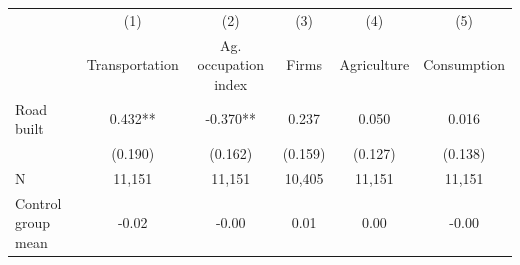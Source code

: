 {
\def\sym#1{\ifmmode^{#1}\else\(^{#1}\)\fi}
\begin{tabular}{l*{5}{c}}
\hline\hline
                         &\multicolumn{1}{c}{(1)}&\multicolumn{1}{c}{(2)}&\multicolumn{1}{c}{(3)}&\multicolumn{1}{c}{(4)}&\multicolumn{1}{c}{(5)}\\
                         &\multicolumn{1}{c}{Transportation}&\multicolumn{1}{c}{Ag. occupation index}&\multicolumn{1}{c}{Firms}&\multicolumn{1}{c}{Agriculture}&\multicolumn{1}{c}{Consumption}\\
\hline
Road built               &       0.432** &      -0.370** &       0.237   &       0.050   &       0.016   \\
                         &     (0.190)   &     (0.162)   &     (0.159)   &     (0.127)   &     (0.138)   \\
\hline
N                        &      11,151   &      11,151   &      10,405   &      11,151   &      11,151   \\
Control group mean       &       -0.02   &       -0.00   &        0.01   &        0.00   &       -0.00   \\
\hline\hline
\end{tabular}
}
